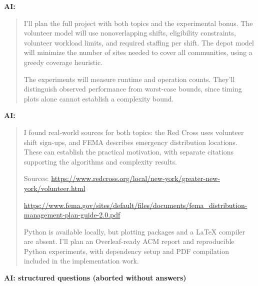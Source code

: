 \par\medskip\noindent\textbf{AI:}\par

\begin{quote}\small\raggedright

I'll plan the full project with both topics and the experimental bonus. The volunteer model will use nonoverlapping shifts, eligibility constraints, volunteer workload limits, and required staffing per shift. The depot model will minimize the number of sites needed to cover all communities, using a greedy coverage heuristic.\par
The experiments will measure runtime and operation counts. They'll distinguish observed performance from worst-case bounds, since timing plots alone cannot establish a complexity bound.\par

\end{quote}

\par\medskip\noindent\textbf{AI:}\par

\begin{quote}\small\raggedright

I found real-world sources for both topics: the Red Cross uses volunteer shift sign-ups, and FEMA describes emergency distribution locations. These can establish the practical motivation, with separate citations supporting the algorithms and complexity results.\par
Sources: \url{https://www.redcross.org/local/new-york/greater-new-york/volunteer.html}\par
\url{https://www.fema.gov/sites/default/files/documents/fema_distribution-management-plan-guide-2.0.pdf}\par
Python is available locally, but plotting packages and a LaTeX compiler are absent. I'll plan an Overleaf-ready ACM report and reproducible Python experiments, with dependency setup and PDF compilation included in the implementation work.\par

\end{quote}

\par\medskip\noindent\textbf{AI: structured questions (aborted without answers)}\par

